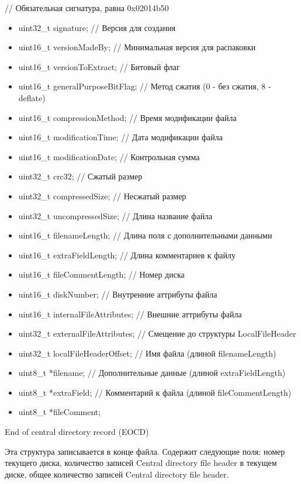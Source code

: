     // Обязательная сигнатура, равна 0x02014b50 
\begin{itemize}
\item    uint32\_t signature;    // Версия для создания
\item    uint16\_t versionMadeBy;    // Минимальная версия для распаковки
\item    uint16\_t versionToExtract;    // Битовый флаг
\item    uint16\_t generalPurposeBitFlag;    // Метод сжатия (0 - без сжатия, 8 - deflate)
\item    uint16\_t compressionMethod;    // Время модификации файла
\item    uint16\_t modificationTime;    // Дата модификации файла
\item    uint16\_t modificationDate;    // Контрольная сумма
\item    uint32\_t crc32;    // Сжатый размер
\item    uint32\_t compressedSize;    // Несжатый размер
\item    uint32\_t uncompressedSize;    // Длина название файла
\item    uint16\_t filenameLength;    // Длина поля с дополнительными данными
\item    uint16\_t extraFieldLength;    // Длина комментариев к файлу
\item    uint16\_t fileCommentLength;    // Номер диска
\item    uint16\_t diskNumber;    // Внутренние аттрибуты файла
\item    uint16\_t internalFileAttributes;    // Внешние аттрибуты файла
\item    uint32\_t externalFileAttributes;    // Смещение до структуры LocalFileHeader
\item    uint32\_t localFileHeaderOffset;    // Имя файла (длиной filenameLength)
\item    uint8\_t *filename;    // Дополнительные данные (длиной extraFieldLength)
\item    uint8\_t *extraField;    // Комментарий к файла (длиной fileCommentLength)
\item   uint8\_t *fileComment;
\end{itemize}

End of central directory record (EOCD)

Эта структура записывается в конце файла. Содержит следующие поля: номер текущего диска, количество записей Central directory file header в текущем диске, общее количество записей Central directory file header.

